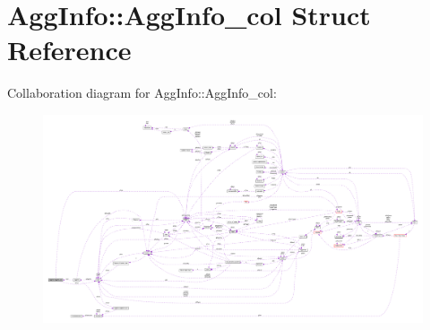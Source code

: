 \hypertarget{structAggInfo_1_1AggInfo__col}{}\section{Agg\+Info\+:\+:Agg\+Info\+\_\+col Struct Reference}
\label{structAggInfo_1_1AggInfo__col}


Collaboration diagram for Agg\+Info\+:\+:Agg\+Info\+\_\+col\+:\nopagebreak
\begin{figure}[H]
\begin{center}
\leavevmode
\includegraphics[width=350pt]{structAggInfo_1_1AggInfo__col__coll__graph}
\end{center}
\end{figure}
